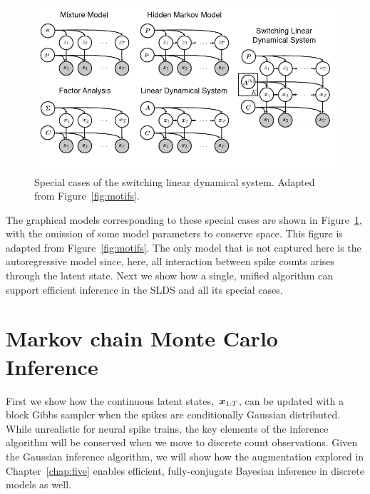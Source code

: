 \begin{figure}[t]
  \centering%
\includegraphics[width=5.5in]{figures/ch8/graphical_models} 
\vspace{-.25in}
\caption{Special cases of the switching linear dynamical system.
  Adapted from Figure~\ref{fig:motifs}.}
\label{fig:slds_models}
\end{figure}

The graphical models corresponding to these special cases are shown in
Figure~\ref{fig:slds_models}, with the omission of some model
parameters to conserve space. This figure is adapted from
Figure~\ref{fig:motifs}. The only model that is not captured here
is the autoregressive model since, here, all interaction between
spike counts arises through the latent state. Next we show how
a single, unified algorithm can support efficient
inference in the SLDS and all its special cases.


\section{Markov chain Monte Carlo Inference}


First we show how the continuous latent states,~$\boldsymbol{x}_{1:T}$, can be
updated with a block Gibbs sampler when the spikes are conditionally
Gaussian distributed.  While unrealistic for neural spike trains, the
key elements of the inference algorithm will be conserved when we move
to discrete count observations.  Given the Gaussian inference
algorithm, we will show how the \polyagamma augmentation explored in
Chapter~\ref{chap:five} enables efficient, fully-conjugate Bayesian
inference in discrete models as well.

